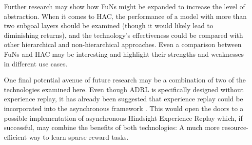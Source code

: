 \documentclass[runningheads]{llncs}
\begin{document}
Further research may show how FuNs might be expanded to increase the level of abstraction. When it comes to HAC, the performance of a model with more than two subgoal layers should be examined (though it would likely lead to diminishing returns), and the technology's effectiveness could be compared with other hierarchical and non-hierarchical approaches. Even a comparison between FuNs and HAC may be interesting and highlight their strengths and weaknesses in different use cases.

One final potential avenue of future research may be a combination of two of the technologies examined here. Even though ADRL is specifically designed without experience replay, it has already been suggested that experience replay could be incorporated into the asynchronous framework \cite{mnih2016asynchronous}. This would open the doors to a possible implementation of asynchronous Hindsight Experience Replay which, if successful, may combine the benefits of both technologies: A much more resource-efficient way to learn sparse reward tasks.

%
%



\end{document}
